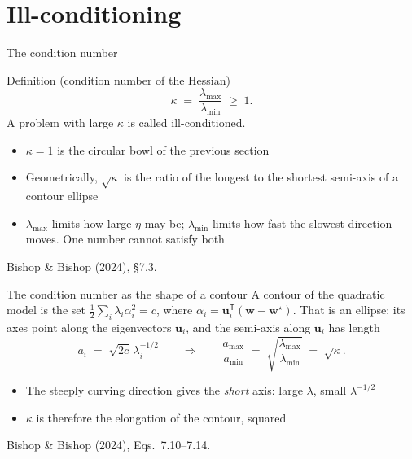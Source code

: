 \documentclass[aspectratio=169, 11pt]{beamer}
\newcommand{\srcline}[1]{%
  \par\vspace{0.25em}%
  {\scriptsize\color{mcMuted}\hfill #1\par}}
\begin{document}
\section{Ill-conditioning}

\begin{frame}{The condition number}
  \begin{block}{Definition (condition number of the Hessian)}
    \[
      \kappa \;=\; \frac{\lambda_{\max}}{\lambda_{\min}} \;\geq\; 1 .
    \]
    A problem with large $\kappa$ is called \alert{ill-conditioned}.
  \end{block}
  \vspace{0.4em}
  \begin{itemize}\itemsep0.4em
    \item $\kappa = 1$ is the circular bowl of the previous section
    \item Geometrically, $\sqrt{\kappa}$ is the ratio of the longest to
          the shortest semi-axis of a contour ellipse
    \item $\lambda_{\max}$ limits how large $\eta$ may be;
          $\lambda_{\min}$ limits how fast the slowest direction moves.
          One number cannot satisfy both
  \end{itemize}
  \srcline{Bishop \& Bishop (2024), \S7.3.}
\end{frame}

\begin{frame}{The condition number as the shape of a contour}
  \vspace{-0.1em}
  A contour of the quadratic model is the set
  $\tfrac12\sum_i \lambda_i \alpha_i^2 = c$, where
  $\alpha_i = \mathbf{u}_i^{\mathsf T}(\mathbf{w}-\mathbf{w}^\star)$.
  That is an \alert{ellipse}: its axes point along the eigenvectors
  $\mathbf{u}_i$, and the semi-axis along $\mathbf{u}_i$ has length
  \[
    a_i \;=\; \sqrt{2c}\,\lambda_i^{-1/2}
    \qquad\Longrightarrow\qquad
    \frac{a_{\max}}{a_{\min}}
      \;=\; \sqrt{\frac{\lambda_{\max}}{\lambda_{\min}}}
      \;=\; \sqrt{\kappa}.
  \]
  \vspace{-0.4em}
  \begin{itemize}\itemsep0.35em
    \item The steeply curving direction gives the \emph{short} axis:
          large $\lambda$, small $\lambda^{-1/2}$
    \item $\kappa$ is therefore the elongation of the contour, squared
  \end{itemize}
  \srcline{Bishop \& Bishop (2024), Eqs.~7.10--7.14.}
\end{frame}
\end{document}
